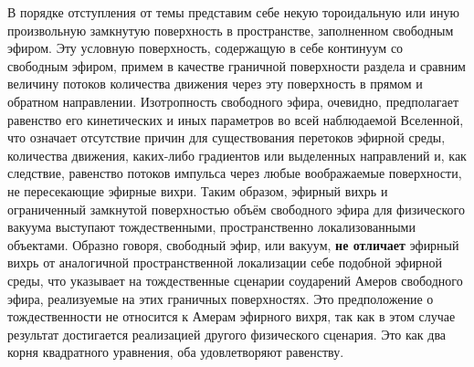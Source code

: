В порядке отступления от темы представим себе некую тороидальную или иную произвольную замкнутую поверхность в пространстве, заполненном свободным эфиром. Эту условную поверхность, содержащую в себе континуум со свободным эфиром, примем в качестве граничной поверхности раздела и сравним величину потоков количества движения через эту поверхность в прямом и обратном направлении. Изотропность свободного эфира, очевидно, предполагает равенство его кинетических и иных параметров во всей наблюдаемой Вселенной, что означает отсутствие причин для существования перетоков эфирной среды, количества движения, каких-либо градиентов или выделенных направлений и, как следствие, равенство потоков импульса через любые воображаемые поверхности, не пересекающие эфирные вихри. Таким образом, эфирный вихрь и ограниченный замкнутой поверхностью объём свободного эфира для физического вакуума выступают тождественными, пространственно локализованными объектами. Образно говоря, свободный эфир, или вакуум, \textbf{не отличает} эфирный вихрь от аналогичной пространственной локализации себе подобной эфирной среды, что указывает на тождественные сценарии соударений Амеров свободного эфира, реализуемые на этих граничных поверхностях. Это предположение о тождественности не относится к Амерам эфирного вихря, так как в этом случае результат достигается реализацией другого физического сценария. Это как два корня квадратного уравнения, оба удовлетворяют равенству.

